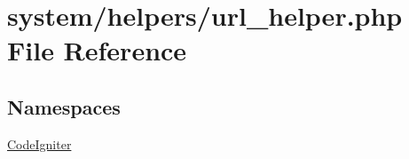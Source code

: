 \hypertarget{url__helper_8php}{\section{system/helpers/url\-\_\-helper.php File Reference}
\label{url__helper_8php}
}
\subsection*{Namespaces}
\begin{DoxyCompactItemize}
\item 
\hyperlink{namespace_code_igniter}{Code\-Igniter}
\end{DoxyCompactItemize}
